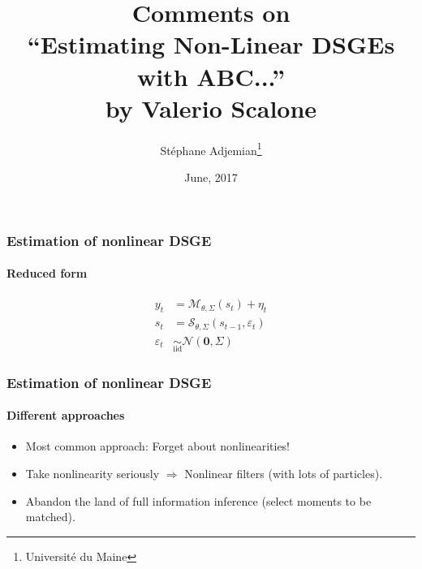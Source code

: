 \documentclass[10pt]{beamer}
\begin{document}
\title{Comments on\\``Estimating Non-Linear DSGEs with ABC...''\\ by Valerio Scalone}
\author{Stéphane Adjemian\footnote{Université du Maine}}
\date{June, 2017}


\begin{frame}
  \maketitle
\end{frame}


\begin{frame}[c]
\frametitle{Estimation of nonlinear DSGE}
\framesubtitle{Reduced form}

  
\[
  \begin{split}
    y_t &= \mathcal M_{\theta, \Sigma} (s_t)+ \eta_t\\
    s_t &= \mathcal S_{\theta,\Sigma}(s_{t-1}, \varepsilon_t)\\
    \varepsilon_t &\underset{\mathrm{iid}}{\sim} \mathcal N \left(\mathbf 0, \Sigma\right)
  \end{split}
\]

\end{frame}


\begin{frame}
\frametitle{Estimation of nonlinear DSGE}
\framesubtitle{Different approaches}

\bigskip
\bigskip
  
\begin{itemize}
\item Most common approach: Forget about nonlinearities!\newline
  \bigskip
\item Take nonlinearity seriously $\Rightarrow$ Nonlinear filters (with lots of particles).\newline
  \bigskip
\item Abandon the land of full information inference (select moments to be matched).
\end{itemize}

\end{frame}
\end{document}
